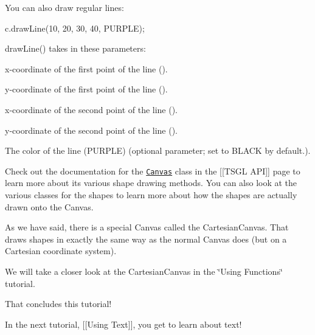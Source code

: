 You can also draw regular lines\+:


\begin{DoxyCode}
c.drawLine(10, 20, 30, 40, PURPLE);
\end{DoxyCode}


draw\+Line() takes in these parameters\+:


\begin{DoxyItemize}
\item x-\/coordinate of the first point of the line ({}).
\item y-\/coordinate of the first point of the line ({}).
\item x-\/coordinate of the second point of the line ({}).
\item y-\/coordinate of the second point of the line ({}).
\item The color of the line ({\ttfamily P\+U\+R\+P\+L\+E}) (optional parameter; set to {\ttfamily B\+L\+A\+C\+K} by default.).
\end{DoxyItemize}

Check out the documentation for the \href{http://calvin-cs.github.io/TSGL/html/_canvas_8h_source.html}{\tt Canvas} class in the \mbox{[}\mbox{[}T\+S\+G\+L A\+P\+I\mbox{]}\mbox{]} page to learn more about its various shape drawing methods. You can also look at the various classes for the shapes to learn more about how the shapes are actually drawn onto the Canvas.

As we have said, there is a special Canvas called the Cartesian\+Canvas. That draws shapes in exactly the same way as the normal Canvas does (but on a Cartesian coordinate system).

We will take a closer look at the Cartesian\+Canvas in the \char`\"{}\+Using Functions\char`\"{} tutorial.

That concludes this tutorial!

In the next tutorial, \mbox{[}\mbox{[}Using Text\mbox{]}\mbox{]}, you get to learn about text! 